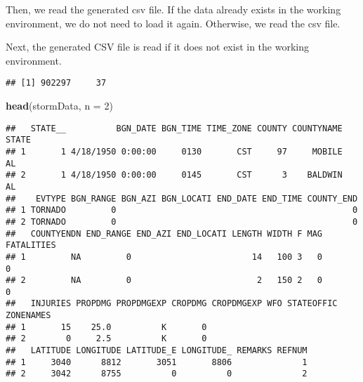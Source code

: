 \documentclass[]{article}
\newenvironment{Shaded}{\begin{snugshade}}{\end{snugshade}}
\newcommand{\KeywordTok}[1]{\textcolor[rgb]{0.13,0.29,0.53}{\textbf{#1}}}
\newcommand{\DataTypeTok}[1]{\textcolor[rgb]{0.13,0.29,0.53}{#1}}
\newcommand{\DecValTok}[1]{\textcolor[rgb]{0.00,0.00,0.81}{#1}}
\newcommand{\StringTok}[1]{\textcolor[rgb]{0.31,0.60,0.02}{#1}}
\newcommand{\ControlFlowTok}[1]{\textcolor[rgb]{0.13,0.29,0.53}{\textbf{#1}}}
\newcommand{\OperatorTok}[1]{\textcolor[rgb]{0.81,0.36,0.00}{\textbf{#1}}}
\newcommand{\NormalTok}[1]{#1}
\begin{document}
Then, we read the generated csv file. If the data already exists in the
working environment, we do not need to load it again. Otherwise, we read
the csv file.

Next, the generated CSV file is read if it does not exist in the working
environment.

\begin{Shaded}
\end{Shaded}

\begin{verbatim}
## [1] 902297     37
\end{verbatim}

\begin{Shaded}
\begin{Highlighting}[]
\KeywordTok{head}\NormalTok{(stormData, }\DataTypeTok{n =} \DecValTok{2}\NormalTok{)}
\end{Highlighting}
\end{Shaded}

\begin{verbatim}
##   STATE__          BGN_DATE BGN_TIME TIME_ZONE COUNTY COUNTYNAME STATE
## 1       1 4/18/1950 0:00:00     0130       CST     97     MOBILE    AL
## 2       1 4/18/1950 0:00:00     0145       CST      3    BALDWIN    AL
##    EVTYPE BGN_RANGE BGN_AZI BGN_LOCATI END_DATE END_TIME COUNTY_END
## 1 TORNADO         0                                               0
## 2 TORNADO         0                                               0
##   COUNTYENDN END_RANGE END_AZI END_LOCATI LENGTH WIDTH F MAG FATALITIES
## 1         NA         0                        14   100 3   0          0
## 2         NA         0                         2   150 2   0          0
##   INJURIES PROPDMG PROPDMGEXP CROPDMG CROPDMGEXP WFO STATEOFFIC ZONENAMES
## 1       15    25.0          K       0                                    
## 2        0     2.5          K       0                                    
##   LATITUDE LONGITUDE LATITUDE_E LONGITUDE_ REMARKS REFNUM
## 1     3040      8812       3051       8806              1
## 2     3042      8755          0          0              2
\end{verbatim}
\end{document}
